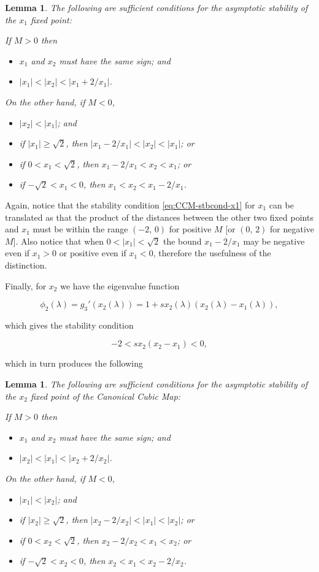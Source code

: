 \documentclass[10pt,twoside,titlepage]{book}
\numberwithin{equation}{chapter}
\numberwithin{figure}{chapter}
\numberwithin{table}{chapter}
\theoremstyle{plain}%
\newtheorem{lem}[thm]{Lemma}
\theoremstyle{definition}
\theoremstyle{remark}
\begin{document}
\begin{lem}
	The following are sufficient conditions for the asymptotic stability of the $x_1$ fixed point:
	
	If $M>0$ then
	\begin{itemize}
		\item $x_1$ and $x_2$ must have \emph{the same} sign; and
		\item $|x_1|<|x_2|<|x_1+2/x_1|$.
	\end{itemize}
	
	On the other hand, if $M<0$,
	\begin{itemize}
		\item $|x_2|<|x_1|$; and
		\item if $|x_1|\geq\sqrt{2}$, then $|x_1-2/x_1|<|x_2|<|x_1|$; or
		\item if $0<x_1<\sqrt{2}$, then $x_1-2/x_1<x_2<x_1$; or
		\item if $-\sqrt{2}<x_1<0$, then $x_1<x_2<x_1-2/x_1$.
	\end{itemize}
\end{lem}

Again, notice that the stability condition \eqref{eq:CCM-stbcond-x1} for $x_1$ can be translated as that the product of the distances between the other two fixed points and $x_1$ must be within the range $(-2,\,0)$ for positive $M$ [or $(0,\,2)$ for negative $M$]. Also notice that when $0<|x_1|<\sqrt{2}$ the bound $x_1-2/x_1$ may be negative even if $x_1>0$ or positive even if $x_1<0$, therefore the usefulness of the distinction.

Finally, for $x_2$ we have the eigenvalue function

\[\phi_2(\lambda)=g_3'(x_2(\lambda))=1+sx_2(\lambda)(x_2(\lambda)-x_1(\lambda)),\]

which gives the stability condition

\begin{equation}
	\label{eq:CCM-stbcond-x2}
	-2<sx_2(x_2-x_1)<0,
\end{equation}

which in turn produces the following

\begin{lem}
	The following are sufficient conditions for the asymptotic stability of the $x_2$ fixed point of the Canonical Cubic Map:
	
	If $M>0$ then
	\begin{itemize}
		\item $x_1$ and $x_2$ must have \emph{the same} sign; and
		\item $|x_2|<|x_1|<|x_2+2/x_2|$.
	\end{itemize}
	
	On the other hand, if $M<0$,
	\begin{itemize}
		\item $|x_1|<|x_2|$; and
		\item if $|x_2|\geq\sqrt{2}$, then $|x_2-2/x_2|<|x_1|<|x_2|$; or
		\item if $0<x_2<\sqrt{2}$, then $x_2-2/x_2<x_1<x_2$; or
		\item if $-\sqrt{2}<x_2<0$, then $x_2<x_1<x_2-2/x_2$.
	\end{itemize}
\end{lem}
\end{document}
